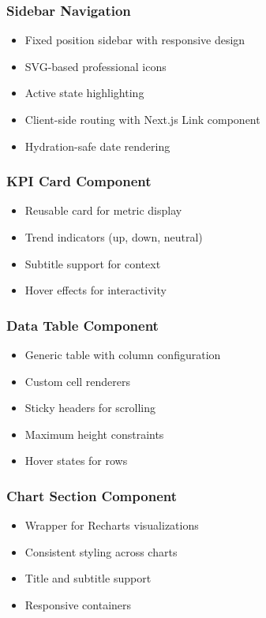\documentclass[12pt,a4paper]{article}
\begin{document}
\subsubsection{Sidebar Navigation}
\begin{itemize}
    \item Fixed position sidebar with responsive design
    \item SVG-based professional icons
    \item Active state highlighting
    \item Client-side routing with Next.js Link component
    \item Hydration-safe date rendering
\end{itemize}

\subsubsection{KPI Card Component}
\begin{itemize}
    \item Reusable card for metric display
    \item Trend indicators (up, down, neutral)
    \item Subtitle support for context
    \item Hover effects for interactivity
\end{itemize}

\subsubsection{Data Table Component}
\begin{itemize}
    \item Generic table with column configuration
    \item Custom cell renderers
    \item Sticky headers for scrolling
    \item Maximum height constraints
    \item Hover states for rows
\end{itemize}

\subsubsection{Chart Section Component}
\begin{itemize}
    \item Wrapper for Recharts visualizations
    \item Consistent styling across charts
    \item Title and subtitle support
    \item Responsive containers
\end{itemize}
\end{document}
